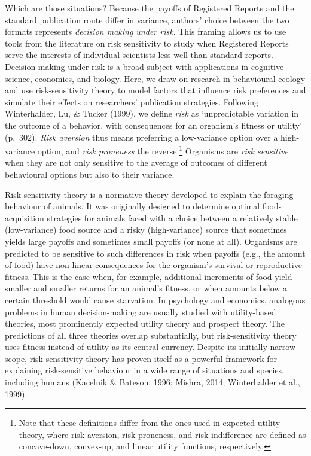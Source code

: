 \documentclass[
  ,man,mask,floatsintext]{apa6}
\begin{document}
Which are those situations?
Because the payoffs of Registered Reports and the standard publication route differ in variance, authors' choice between the two formats represents \emph{decision making under risk}.
This framing allows us to use tools from the literature on risk sensitivity to study when Registered Reports serve the interests of individual scientists less well than standard reports.
Decision making under risk is a broad subject with applications in cognitive science, economics, and biology.
Here, we draw on research in behavioural ecology and use risk-sensitivity theory to model factors that influence risk preferences and simulate their effects on researchers' publication strategies.
Following Winterhalder, Lu, \& Tucker (1999), we define \emph{risk} as `unpredictable variation in the outcome of a behavior, with consequences for an organism's fitness or utility' (p.~302).
\emph{Risk aversion} thus means preferring a low-variance option over a high-variance option, and \emph{risk proneness} the reverse.\footnote{Note that these definitions differ from the ones used in expected utility theory, where risk aversion, risk proneness, and risk indifference are defined as concave-down, convex-up, and linear utility functions, respectively.}
Organisms are \emph{risk sensitive} when they are not only sensitive to the average of outcomes of different behavioural options but also to their variance.

Risk-sensitivity theory is a normative theory developed to explain the foraging behaviour of animals.
It was originally designed to determine optimal food-acquisition strategies for animals faced with a choice between a relatively stable (low-variance) food source and a risky (high-variance) source that sometimes yields large payoffs and sometimes small payoffs (or none at all).
Organisms are predicted to be sensitive to such differences in risk when payoffs (e.g., the amount of food) have non-linear consequences for the organism's survival or reproductive fitness.
This is the case when, for example, additional increments of food yield smaller and smaller returns for an animal's fitness, or when amounts below a certain threshold would cause starvation.
In psychology and economics, analogous problems in human decision-making are usually studied with utility-based theories, most prominently expected utility theory and prospect theory.
The predictions of all three theories overlap substantially, but risk-sensitivity theory uses fitness instead of utility as its central currency.
Despite its initially narrow scope, risk-sensitivity theory has proven itself as a powerful framework for explaining risk-sensitive behaviour in a wide range of situations and species, including humans (Kacelnik \& Bateson, 1996; Mishra, 2014; Winterhalder et al., 1999).
\end{document}
